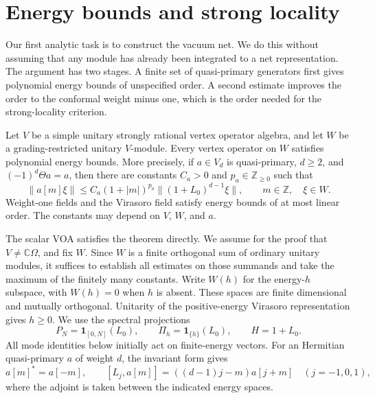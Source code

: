 \section{Energy bounds and strong locality}\label{sec:energy}

Our first analytic task is to construct the vacuum net.  We do this
without assuming that any module has already been integrated to a net
representation.  The argument has two stages.  A finite set of
quasi-primary generators first gives polynomial energy bounds of
unspecified order.  A second estimate improves the order to the conformal
weight minus one, which is the order needed for the strong-locality
criterion.

\begin{theorem}\label{thm:energy}
Let $V$ be a simple unitary strongly rational vertex operator algebra,
and let $W$ be a grading-restricted unitary $V$-module.  Every vertex
operator on $W$ satisfies polynomial energy bounds.  More precisely, if
$a\in V_d$ is quasi-primary, $d\geq2$, and
$(-1)^d\Theta a=a$, then there are constants $C_a>0$ and
$p_a\in\mathbb Z_{\geq0}$ such that
\begin{equation}\label{eq:optimal-vertex-bound}
 \|a[m]\xi\|
 \leq C_a(1+|m|)^{p_a}
       \|(1+L_0)^{d-1}\xi\|,
 \qquad m\in\mathbb Z,\quad \xi\in W.
\end{equation}
Weight-one fields and the Virasoro field satisfy energy bounds of at
most linear order.  The constants may depend on $V$, $W$, and $a$.
\end{theorem}

The scalar VOA satisfies the theorem directly.  We assume for the proof
that $V\ne\mathbb C\Omega$, and fix $W$.  Since $W$ is a finite
orthogonal sum of ordinary unitary modules, it suffices to establish all
estimates on those summands and take the maximum of the finitely many
constants.  Write $W(h)$ for the energy-$h$ subspace, with $W(h)=0$ when
$h$ is absent.  These spaces are finite dimensional and mutually
orthogonal.  Unitarity of the positive-energy Virasoro representation
gives $h\geq0$.  We use the spectral projections
\[
 P_N=\mathbf1_{[0,N]}(L_0),\qquad
 \Pi_h=\mathbf1_{\{h\}}(L_0),\qquad H=1+L_0.
\]
All mode identities below initially act on finite-energy vectors.
For an Hermitian quasi-primary $a$ of weight $d$, the invariant form
gives
\begin{equation}\label{eq:energy-adjoint}
 a[m]^*=a[-m],\qquad
 [L_j,a[m]]=((d-1)j-m)a[j+m]\quad(j=-1,0,1),
\end{equation}
where the adjoint is taken between the indicated energy spaces.

